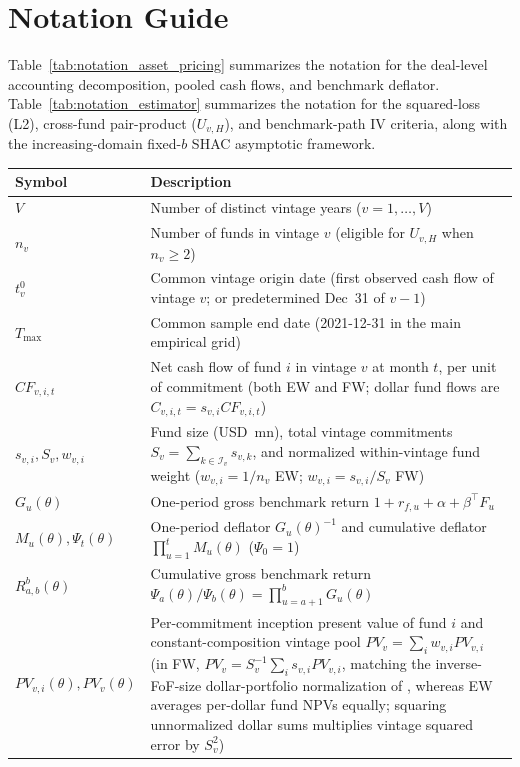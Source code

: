 \section{Notation Guide}
\label{sec:appendix_notation}

Table~\ref{tab:notation_asset_pricing} summarizes the notation for the deal-level accounting decomposition, pooled cash flows, and benchmark deflator. Table~\ref{tab:notation_estimator} summarizes the notation for the squared-loss (L2), cross-fund pair-product ($U_{v,H}$), and benchmark-path IV criteria, along with the increasing-domain fixed-$b$ SHAC asymptotic framework.

\begin{table}[htbp]
	\centering
	\small
	\begin{tabularx}{\textwidth}{@{}lX@{}}
		\toprule
		Symbol & Description \\
		\midrule
		$V$ & Number of distinct vintage years ($v = 1,\dots,V$) \\
		$n_v$ & Number of funds in vintage $v$ (eligible for $U_{v,H}$ when $n_v \ge 2$) \\
		$t_v^0$ & Common vintage origin date (first observed cash flow of vintage $v$; or predetermined Dec~31 of $v-1$) \\
		$T_{\max}$ & Common sample end date (2021-12-31 in the main empirical grid) \\
		$CF_{v,i,t}$ & Net cash flow of fund $i$ in vintage $v$ at month $t$, per unit of commitment (both EW and FW; dollar fund flows are $C_{v,i,t} = s_{v,i} CF_{v,i,t}$) \\
		$s_{v,i}, S_v, w_{v,i}$ & Fund size (USD~mn), total vintage commitments $S_v = \sum_{k \in \mathcal{I}_v} s_{v,k}$, and normalized within-vintage fund weight ($w_{v,i}=1/n_v$ EW; $w_{v,i}=s_{v,i}/S_v$ FW) \\
		$G_u(\theta)$ & One-period gross benchmark return $1 + r_{f,u} + \alpha + \beta^\top F_u$ \\
		$M_u(\theta), \Psi_t(\theta)$ & One-period deflator $G_u(\theta)^{-1}$ and cumulative deflator $\prod_{u=1}^t M_u(\theta)$ ($\Psi_0=1$) \\
		$R^b_{a,b}(\theta)$ & Cumulative gross benchmark return $\Psi_a(\theta)/\Psi_b(\theta) = \prod_{u=a+1}^b G_u(\theta)$ \\
		$PV_{v,i}(\theta), PV_v(\theta)$ & Per-commitment inception present value of fund $i$ and constant-composition vintage pool $PV_v = \sum_i w_{v,i} PV_{v,i}$ (in FW, $PV_v = S_v^{-1}\sum_i s_{v,i} PV_{v,i}$, matching the inverse-FoF-size dollar-portfolio normalization of \citealp[p.~533]{DLP12}, whereas EW averages per-dollar fund NPVs equally; squaring unnormalized dollar sums multiplies vintage squared error by $S_v^2$) \\

\end{tabularx}
\end{table}
